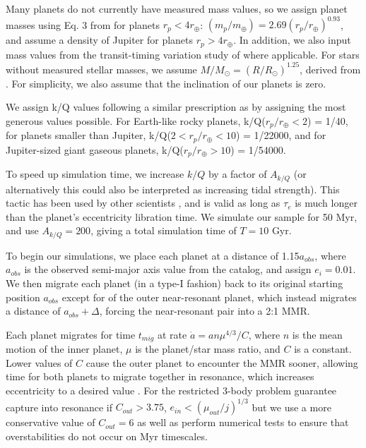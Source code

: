 Many \kep{} planets do not currently have measured mass values, so we assign planet masses using Eq. 3 from \citet{Weiss2014} for planets $r_p < 4 r_{\oplus}$:  $(m_p/m_{\oplus}) = 2.69(r_p/r_{\oplus})^{0.93}$, and assume a density of Jupiter for planets $r_p > 4r_{\oplus}$.  
In addition, we also input mass values from the transit-timing variation study of \citet{Hadden2014} where applicable. 
For stars without measured stellar masses, we assume $M/M_{\odot} = (R/R_{\odot})^{1.25}$, derived from \cite{Demircan1991}.
For simplicity, we also assume that the inclination of our \kep{} planets is zero.

We assign k/Q values following a similar prescription as \cite{Lee2013} by assigning the most generous values possible. For Earth-like rocky planets, k/Q($r_p/r_{\oplus} < 2$) = 1/40, for planets smaller than Jupiter, k/Q($2 < r_p/r_{\oplus} < 10$) = 1/22000, and for Jupiter-sized giant gaseous planets, k/Q($r_p/r_{\oplus} > 10$) = 1/54000. 

To speed up simulation time, we increase $k/Q$ by a factor of $A_{k/Q}$ (or alternatively this could also be interpreted as increasing tidal strength). 
This tactic has been used by other scientists \citep[e.g.][]{Delisle2014}, and is valid as long as $\tau_e$ is much longer than the planet's eccentricity libration time.
We simulate our \kep{} sample for 50 Myr, and use $A_{k/Q} = 200$, giving a total simulation time of $T = 10$ Gyr.

To begin our simulations, we place each planet at a distance of 1.15$a_{obs}$, where $a_{obs}$ is the observed semi-major axis value from the \kep{} catalog, and assign $e_i = 0.01$. 
We then migrate each planet (in a type-I fashion) back to its original starting position $a_{obs}$ except for of the outer near-resonant planet, which instead migrates a distance of $a_{obs} + \Delta$, forcing the near-resonant pair into a 2:1 MMR.

Each planet migrates for time $t_{mig}$ at rate $\dot{a} = an\mu^{4/3}/C$, where $n$ is the mean motion of the inner planet, $\mu$ is the planet/star mass ratio, and $C$ is a constant. 
Lower values of $C$ cause the outer planet to encounter the MMR sooner, allowing time for both planets to migrate together in resonance, which increases eccentricity to a desired value \citep{Lee2002}. 
For the restricted 3-body problem \citet{Goldreich2014} guarantee capture into resonance if $C_{out} > 3.75$, $e_{in} < (\mu_{out}/j)^{1/3}$ but we use a more conservative value of $C_{out} = 6$ as well as perform numerical tests to ensure that overstabilities do not occur on Myr timescales. 

